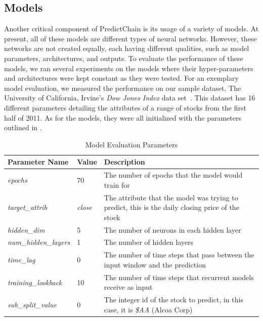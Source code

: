 \documentclass{ledger}
\begin{document}
\subsection{Models}

Another critical component of PredictChain is its usage of a variety of models. At present, all of these models are different types of neural networks. However, these networks are not created equally, each having different qualities, such as model parameters, architectures, and outputs. To evaluate the performance of these models, we ran several experiments on the models where their hyper-parameters and architectures were kept constant as they were tested. For an exemplary model evaluation, we measured the performance on our sample dataset, The University of California, Irvine's \textit{Dow Jones Index} data set~\cite{brown2013dynamic}.  This dataset has 16 different parameters detailing the attributes of a range of stocks from the first half of 2011.
As for the models, they were all initialized with the parameters outlined in .

\begin{table}[!htbp]
    \begin{center}
        \caption{{Model Evaluation Parameters}}
        \label{tab:evalParams}
        \bgroup
        \def\arraystretch{1.2}
        \begin{tabular}{|p{4cm}|p{1cm}|p{8cm}|}
            \hline
            \textbf{Parameter Name} & \textbf{Value} & \textbf{Description}\\
            \hline
            \textit{epochs} & 70 & The number of epochs that the model would train for\\
            \hline
            \textit{target\_attrib} & \textit{close} & The attribute that the model was trying to predict, this is the daily closing price of the stock\\
            \hline
            \textit{hidden\_dim} & 5 & The number of neurons in each hidden layer\\
            \hline
            \textit{num\_hidden\_layers} & 1 & The number of hidden layers\\
            \hline
            \textit{time\_lag} & 0 & The number of time steps that pass between the input window and the prediction\\
            \hline
            \textit{training\_lookback} & 10 & The number of time steps that recurrent models receive as input\\
            \hline
            \textit{sub\_split\_value} & 0 & The integer id of the stock to predict, in this case, it is \textit{\$AA} (Alcoa Corp)\\
            \hline
        \end{tabular}
        \egroup
    \end{center}
\end{table}
\end{document}
